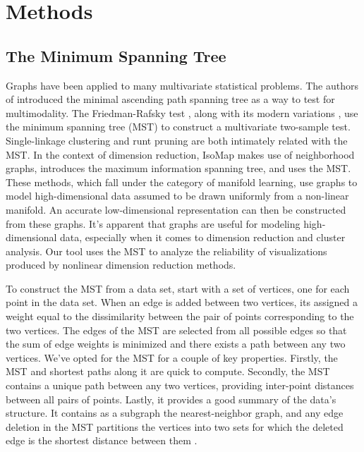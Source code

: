 \documentclass{article}
\begin{document}
\section{Methods}

\subsection{The Minimum Spanning Tree}
Graphs have been applied to many multivariate statistical problems. The authors of \cite{MAP test} introduced the minimal ascending path spanning tree as a way to test for multimodality. The Friedman-Rafsky test \cite{Friedman-Rafsky test}, along with its modern variations \cite{Friedman-Rafsky variation 1, Friedman-Rafsky variation 2, Friedman-Rafsky variation 3}, use the minimum spanning tree (MST) to construct a multivariate two-sample test. Single-linkage clustering \cite{single-linkage and MST} and runt pruning \cite{runt pruning} are both intimately related with the MST. In the context of dimension reduction, IsoMap \cite{IsoMap} makes use of neighborhood graphs, \cite{MIST example} introduces the maximum information spanning tree, and \cite{MST example} uses the MST. These methods, which fall under the category of manifold learning, use graphs to model high-dimensional data assumed to be drawn uniformly from a non-linear manifold. An accurate low-dimensional representation can then be constructed from these graphs. It's apparent that graphs are useful for modeling high-dimensional data, especially when it comes to dimension reduction and cluster analysis. Our tool uses the MST to analyze the reliability of visualizations produced by nonlinear dimension reduction methods.

To construct the MST from a data set, start with a set of vertices, one for each point in the data set. When an edge is added between two vertices, its assigned a weight equal to the dissimilarity between the pair of points corresponding to the two vertices. The edges of the MST are selected from all possible edges so that the sum of edge weights is minimized and there exists a path between any two vertices. We've opted for the MST for a couple of key properties. Firstly, the MST and shortest paths along it are quick to compute. Secondly, the MST contains a unique path between any two vertices, providing inter-point distances between all pairs of points. Lastly, it provides a good summary of the data's structure. It contains as a subgraph the nearest-neighbor graph, and any edge deletion in the MST partitions the vertices into two sets for which the deleted edge is the shortest distance between them \cite{Friedman-Rafsky test}.
\end{document}
